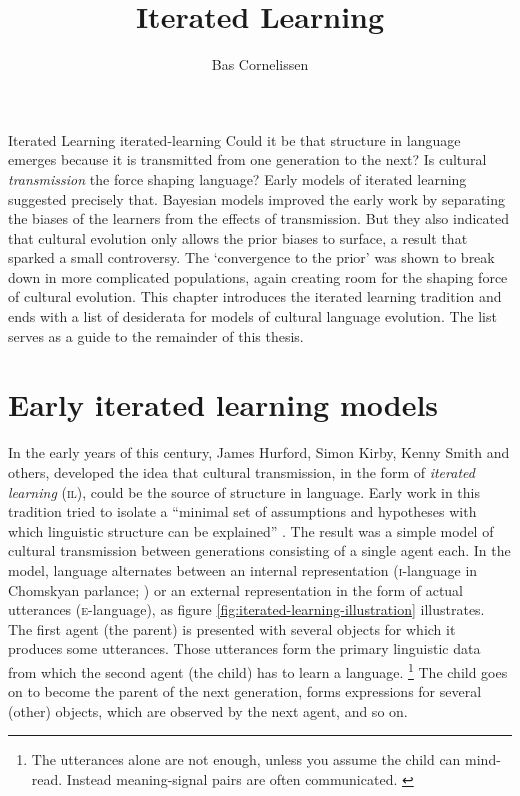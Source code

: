 \documentclass{../src/bcthesispart}
\title{Iterated Learning}
\author{Bas Cornelissen}
\begin{document}

%
	{Iterated Learning}%
	{iterated-learning}{%
	Could it be that structure in language emerges because it is transmitted from one generation to the next?
	Is cultural \emph{transmission} the force shaping language?
	Early models of iterated learning suggested precisely that.
	Bayesian models improved the early work by separating the biases of the learners from the effects of transmission.
	But they also indicated that cultural evolution only allows the prior biases to surface, a result that sparked a small controversy.
	The ‘convergence to the prior’ was shown to break down in more complicated populations, again creating room for the shaping force of cultural evolution.
	This chapter introduces the iterated learning tradition and ends with a list of desiderata for models of cultural language evolution.
	The list serves as a guide to the remainder of this thesis.
}




\section{Early iterated learning models}


In the early years of this century, James Hurford, Simon Kirby, Kenny Smith and others, developed the idea that cultural transmission, in the form of \emph{iterated learning} (\textsc{il}), could be the source of structure in language.
Early work in this tradition tried to isolate a “minimal set of assumptions and hypotheses with which linguistic structure can be explained”  \parencite{Brighton2002}.
The result was a simple model of cultural transmission between generations consisting of a single agent each.
In the model, language alternates between an internal representation (\textsc{i}-language in Chomskyan parlance; \cite[19--24]{Chomsky1986}) or an external representation in the form of actual utterances (\textsc{e}-language), as figure \ref{fig:iterated-learning-illustration} illustrates.
The first agent (the parent) is presented with several objects for which it produces some utterances.
Those utterances form the primary linguistic data from which the second agent (the child) has to learn a language.%
	\footnote{%
	The utterances alone are not enough, unless you assume the child can mind-read. Instead meaning-signal pairs are often communicated.
		\label{fn:mind-read}
	}
The child goes on to become the parent of the next generation, forms expressions for several (other) objects, which are observed by the next agent, and so on.
\end{document}
